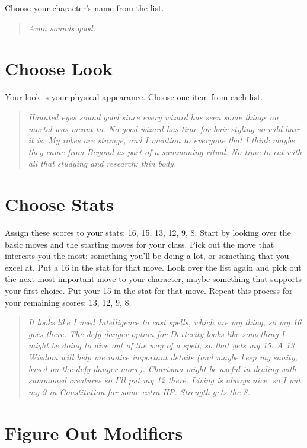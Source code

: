  Choose your character's name from the list.


 \begin{quote}
\emph{Avon sounds good.}
\end{quote}
\section{Choose Look}


 Your look is your physical appearance. Choose one item from each list.


\begin{quote}
\emph{Haunted eyes sound good since every wizard has seen some things no mortal was meant to. No good wizard has time for hair styling so wild hair it is. My robes are strange, and I mention to everyone that I think maybe they came from Beyond as part of a summoning ritual. No time to eat with all that studying and research: thin body.}
\end{quote}
\section{Choose Stats}


 Assign these scores to your stats: 16, 15, 13, 12, 9, 8. Start by looking over the basic moves and the starting moves for your class. Pick out the move that interests you the most: something you'll be doing a lot, or something that you excel at. Put a 16 in the stat for that move. Look over the list again and pick out the next most important move to your character, maybe something that supports your first choice. Put your 15 in the stat for that move. Repeat this process for your remaining scores: 13, 12, 9, 8.

\begin{quote}
\emph{It looks like I need Intelligence to cast spells, which are my thing, so my 16 goes there. The defy danger option for Dexterity looks like something I might be doing to dive out of the way of a spell, so that gets my 15. A 13 Wisdom will help me notice important details (and maybe keep my sanity, based on the defy danger move). Charisma might be useful in dealing with summoned creatures so I'll put my 12 there. Living is always nice, so I put my 9 in Constitution for some extra HP\@. Strength gets the 8.}
\end{quote}
\section{Figure Out Modifiers}


